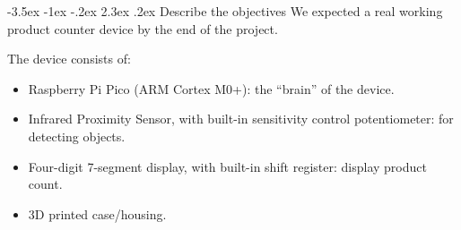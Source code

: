 \documentclass[13pt,a4paper,twoside]{report}
\makeatletter
\renewcommand\section{\@startsection {section}{1}{-1em}%
  {-3.5ex \@plus -1ex \@minus -.2ex}%
  {2.3ex \@plus.2ex}%
  {\normalfont\Large\bfseries}}
\makeatother
\begin{document}
\section{Describe the objectives}
We expected a real working product counter device by the end of the project. 

The device consists of:
\begin{itemize}
\item Raspberry Pi Pico (ARM Cortex M0+): the ``brain'' of the device.
\item Infrared Proximity Sensor, with built-in sensitivity control potentiometer: for detecting objects.
\item Four-digit 7-segment display, with built-in shift register: display product count.
\item 3D printed case/housing.
\end{itemize}
\end{document}
